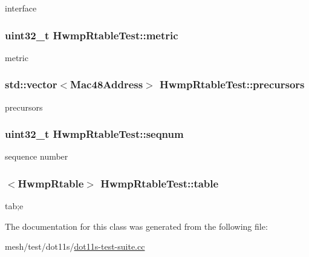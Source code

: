 interface 

\subsubsection[{\texorpdfstring{metric}{metric}}]{\setlength{\rightskip}{0pt plus 5cm}uint32\+\_\+t Hwmp\+Rtable\+Test\+::metric\hspace{0.3cm}{\ttfamily [private]}}\hypertarget{classHwmpRtableTest_aca3e3ee0bed4ac65834490ca9b1fbdf5}{}\label{classHwmpRtableTest_aca3e3ee0bed4ac65834490ca9b1fbdf5}


metric 

\subsubsection[{\texorpdfstring{precursors}{precursors}}]{\setlength{\rightskip}{0pt plus 5cm}std\+::vector$<${\bf Mac48\+Address}$>$ Hwmp\+Rtable\+Test\+::precursors\hspace{0.3cm}{\ttfamily [private]}}\hypertarget{classHwmpRtableTest_a8ba7203ed0eb37c643b78cbf3a3aa8b5}{}\label{classHwmpRtableTest_a8ba7203ed0eb37c643b78cbf3a3aa8b5}


precursors 

\subsubsection[{\texorpdfstring{seqnum}{seqnum}}]{\setlength{\rightskip}{0pt plus 5cm}uint32\+\_\+t Hwmp\+Rtable\+Test\+::seqnum\hspace{0.3cm}{\ttfamily [private]}}\hypertarget{classHwmpRtableTest_a9286f1003bbc201322c0f2ab9cc85097}{}\label{classHwmpRtableTest_a9286f1003bbc201322c0f2ab9cc85097}


sequence number 

\subsubsection[{\texorpdfstring{table}{table}}]{$<${\bf Hwmp\+Rtable}$>$ Hwmp\+Rtable\+Test\+::table\hspace{0.3cm}{\ttfamily [private]}}\hypertarget{classHwmpRtableTest_a2189a3cb5cad7f08c561dae58fee8a6a}{}\label{classHwmpRtableTest_a2189a3cb5cad7f08c561dae58fee8a6a}


tab;e 



The documentation for this class was generated from the following file\+:\begin{DoxyCompactItemize}
\item 
mesh/test/dot11s/\hyperlink{dot11s-test-suite_8cc}{dot11s-\/test-\/suite.\+cc}\end{DoxyCompactItemize}
